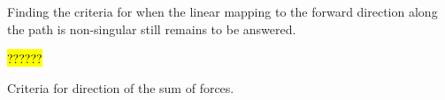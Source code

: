 Finding the criteria for when the linear mapping to the forward direction along the path is non-singular still remains to be answered.

\hl{??????}

Criteria for direction of the sum of forces.



